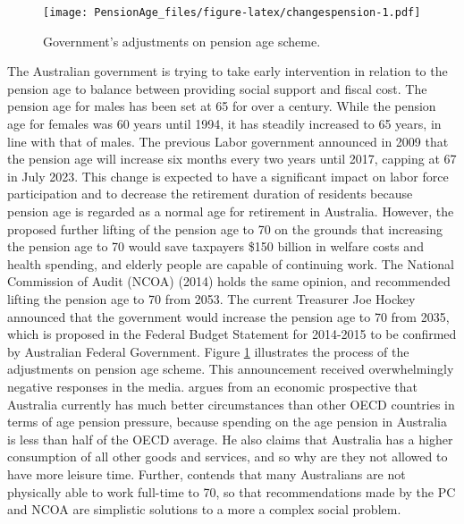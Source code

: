 \documentclass[11pt,a4paper,]{article}
\begin{document}
\begin{figure}
\centering
\texttt{[image: PensionAge\_files/figure-latex/changespension-1.pdf]}
\caption{\label{fig:changespension}Government's adjustments on pension age
scheme.}
\end{figure}

The Australian government is trying to take early intervention in
relation to the pension age to balance between providing social support
and fiscal cost. The pension age for males has been set at 65 for over a
century. While the pension age for females was 60 years until 1994, it
has steadily increased to 65 years, in line with that of males. The
previous Labor government announced in 2009 that the pension age will
increase six months every two years until 2017, capping at 67 in July
2023. This change is expected to have a significant impact on labor
force participation and to decrease the retirement duration of residents
because pension age is regarded as a normal age for retirement in
Australia. However, the \textcite{PC13} proposed further lifting of the
pension age to 70 on the grounds that increasing the pension age to 70
would save taxpayers \$150 billion in welfare costs and health spending,
and elderly people are capable of continuing work. The National
Commission of Audit (NCOA) (2014) holds the same opinion, and
recommended lifting the pension age to 70 from 2053. The current
Treasurer Joe Hockey announced that the government would increase the
pension age to 70 from 2035, which is proposed in the Federal Budget
Statement for 2014-2015 to be confirmed by Australian Federal
Government. Figure \ref{fig:changespension} illustrates the process of
the adjustments on pension age scheme. This announcement received
overwhelmingly negative responses in the media. \textcite{Guest14}
argues from an economic prospective that Australia currently has much
better circumstances than other OECD countries in terms of age pension
pressure, because spending on the age pension in Australia is less than
half of the OECD average. He also claims that Australia has a higher
consumption of all other goods and services, and so why are they not
allowed to have more leisure time. Further, \textcite{Power14} contends
that many Australians are not physically able to work full-time to 70,
so that recommendations made by the PC and NCOA are simplistic solutions
to a more a complex social problem.
\end{document}
